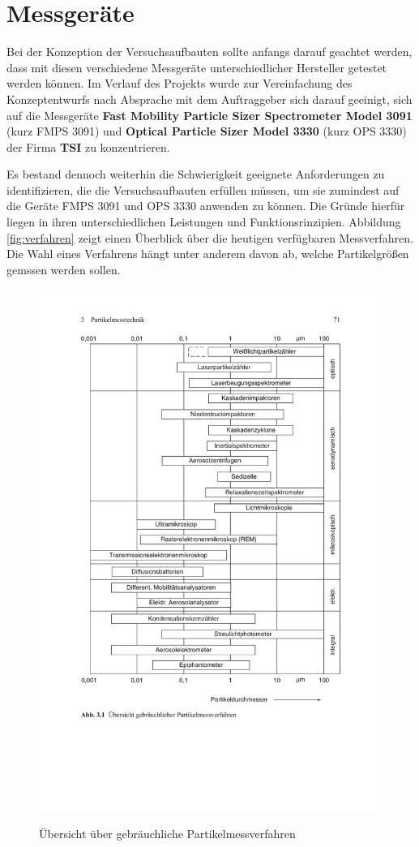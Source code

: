 \section{Messger\"{a}te}
Bei der Konzeption der Versuchsaufbauten sollte anfangs darauf geachtet werden, dass mit diesen verschiedene Messger\"{a}te unterschiedlicher Hersteller getestet werden k\"{o}nnen. Im Verlauf des Projekts wurde zur Vereinfachung des Konzeptentwurfs nach Absprache mit dem Auftraggeber sich darauf geeinigt, sich auf die Messger\"{a}te \textbf{Fast Mobility Particle Sizer Spectrometer Model 3091} (kurz FMPS 3091) und \textbf{Optical Particle Sizer Model 3330} (kurz OPS 3330) der Firma \textbf{TSI} zu konzentrieren. 

Es bestand dennoch weiterhin die Schwierigkeit geeignete Anforderungen zu identifizieren, die die Versuchsaufbauten erf\"{u}llen m\"{u}ssen, um sie zumindest auf die Ger\"{a}te FMPS 3091 und OPS 3330 anwenden zu k\"{o}nnen. Die Gr\"{u}nde hierf\"{u}r liegen in ihren unterschiedlichen Leistungen und Funktionsrinzipien. Abbildung \ref{fig:verfahren} zeigt einen \"{U}berblick \"{u}ber die heutigen verf\"{u}gbaren Messverfahren. Die Wahl eines Verfahrens h\"{a}ngt unter anderem davon ab, welche Partikelgr\"{o}{\ss}en gemssen werden sollen. 

\begin{figure}[H]
	\myfloatalign
	{\includegraphics[width=.6\linewidth]{gfx/measuring_dev/partikelmessverfahren.pdf}} \quad
	\caption[\"{U}bersicht \"{u}ber gebr\"{a}uchliche Partikelmessverfahren\cite{reinraum}]
	{\"{U}bersicht \"{u}ber gebr\"{a}uchliche Partikelmessverfahren\cite{reinraum}}
\end{figure}

